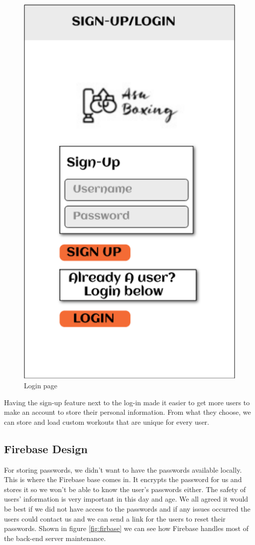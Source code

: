 \documentclass[a4paper,12pt]{report}
\begin{document}
\begin{figure}[h]
\begin{center}
\includegraphics[scale=.5]{images/loginPageBorder.png}
\end{center}
\caption{Login page}
\label{fig:LazyLoading}
\end{figure}

Having the sign-up feature next to the log-in made it easier to get more users to make an account to store their personal information. From what they choose, we can store and load custom workouts that are unique for every user. 
\subsection{Firebase Design}
For storing passwords, we didn't want to have the passwords available locally. This is where the Firebase base comes in. It encrypts the password for us and stores it so we won't be able to know the user's passwords either. The safety of users' information is very important in this day and age. We all agreed it would be best if we did not have access to the passwords and if any issues occurred the users could contact us and we can send a link for the users to reset their passwords. Shown in figure \ref{fig:firbase} we can see how Firebase handles most of the back-end server maintenance.
\end{document}
